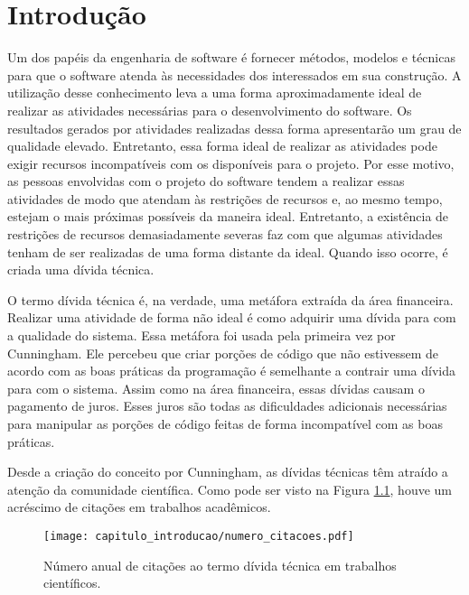 \chapter{Introdução}

Um dos papéis da engenharia de software é fornecer métodos, modelos e técnicas para que o software atenda às necessidades dos interessados em sua construção. A utilização desse conhecimento leva a uma forma aproximadamente ideal de realizar as atividades necessárias para o desenvolvimento do software. Os resultados  gerados por atividades realizadas dessa forma apresentarão um grau de qualidade elevado. Entretanto, essa forma ideal de realizar as atividades pode exigir recursos incompatíveis com os disponíveis para o projeto. Por esse motivo, as pessoas envolvidas com o projeto do software tendem a realizar essas atividades de modo que atendam às restrições de recursos e, ao mesmo tempo, estejam o mais próximas possíveis da maneira ideal. Entretanto, a existência de restrições de recursos demasiadamente severas faz com que algumas atividades tenham de ser realizadas de uma forma distante da ideal. Quando isso ocorre, é criada uma dívida técnica.




O termo dívida técnica é, na verdade, uma metáfora extraída da área financeira. Realizar uma atividade de forma não ideal é como adquirir uma dívida para com a qualidade do sistema.  Essa metáfora foi usada pela primeira vez por Cunningham\cite{cunningham1993wycash}. Ele percebeu que criar porções de código que não estivessem de acordo com as boas práticas da programação é semelhante a contrair uma dívida para com o sistema. Assim como na área financeira, essas dívidas causam o pagamento de juros. Esses juros são todas as dificuldades adicionais necessárias para manipular as porções de código feitas de forma incompatível com as boas práticas. 

Desde a criação do conceito por Cunningham\cite{cunningham1993wycash}, as dívidas técnicas têm atraído a atenção da comunidade científica.  Como pode ser visto na Figura \ref{fig:cap1_citacoes_td_ano}, houve um acréscimo de citações em trabalhos acadêmicos. 


  \begin{figure}[H]
  \centering
  \texttt{[image: capitulo\_introducao/numero\_citacoes.pdf]} 
  \caption{Número anual de citações ao termo dívida técnica em trabalhos científicos. }
  \label{fig:cap1_citacoes_td_ano} 
\end{figure}


